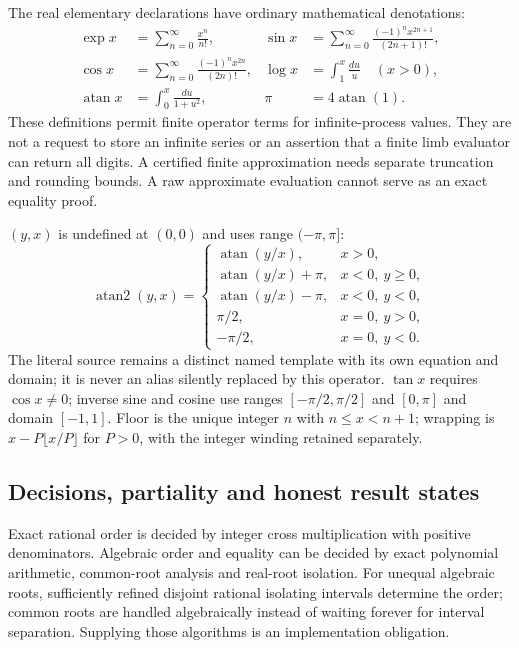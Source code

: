The real elementary declarations have ordinary mathematical denotations:
\begin{align*}
 \exp x&=\sum_{n=0}^{\infty}\frac{x^n}{n!},&
 \sin x&=\sum_{n=0}^{\infty}\frac{(-1)^n x^{2n+1}}{(2n+1)!},\\
 \cos x&=\sum_{n=0}^{\infty}\frac{(-1)^n x^{2n}}{(2n)!},&
 \log x&=\int_1^x\frac{du}{u}\quad(x>0),\\
 \operatorname{atan}x&=\int_0^x\frac{du}{1+u^2},&
 \pi&=4\operatorname{atan}(1).
\end{align*}
These definitions permit finite operator terms for infinite-process values.
They are not a request to store an infinite series or an assertion that a finite
limb evaluator can return all digits. A certified finite approximation needs
separate truncation and rounding bounds. A raw approximate evaluation cannot
serve as an exact equality proof.

$(y,x)$ is undefined at $(0,0)$ and uses range $(-\pi,\pi]$:
\[
 \operatorname{atan2}(y,x)=
 \begin{cases}
 \operatorname{atan}(y/x),&x>0,\\
 \operatorname{atan}(y/x)+\pi,&x<0,\ y\ge0,\\
 \operatorname{atan}(y/x)-\pi,&x<0,\ y<0,\\
 \pi/2,&x=0,\ y>0,\\
 -\pi/2,&x=0,\ y<0.
 \end{cases}
\]
The literal source  remains a distinct named template with its own
equation and domain; it is never an alias silently replaced by this operator.
$\tan x$ requires $\cos x\ne0$; inverse sine and cosine use ranges
$[-\pi/2,\pi/2]$ and $[0,\pi]$ and domain $[-1,1]$. Floor is the unique
integer $n$ with $n\le x<n+1$; wrapping is
$x-P\lfloor x/P\rfloor$ for $P>0$, with the integer winding retained separately.

\subsection{Decisions, partiality and honest result states}
Exact rational order is decided by integer cross multiplication with positive
denominators. Algebraic order and equality can be decided by exact polynomial
arithmetic, common-root analysis and real-root isolation. For unequal algebraic
roots, sufficiently refined disjoint rational isolating intervals determine the
order; common roots are handled algebraically instead of waiting forever for
interval separation. Supplying those algorithms is an implementation obligation.

